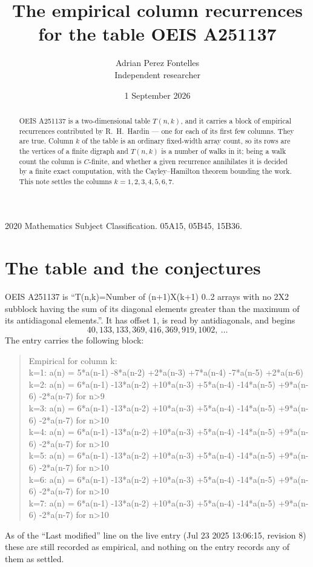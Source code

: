 \documentclass[11pt,a4paper]{article}
\title{The empirical column recurrences for the table OEIS A251137}
\author{Adrian Perez Fontelles\\ \small Independent researcher}
\date{1 September 2026}
\theoremstyle{plain}
\theoremstyle{definition}
\begin{document}
\maketitle

\begin{abstract}
OEIS A251137 is a two-dimensional table $T(n,k)$, and it carries a block of empirical
recurrences contributed by R.~H.~Hardin --- one for each of its first few columns. They are
true. Column $k$ of the table is an ordinary fixed-width array count, so its rows are the
vertices of a finite digraph and $T(n,k)$ is a number of walks in it; being a walk count the
column is $C$-finite, and whether a given recurrence annihilates it is decided by a finite
exact computation, with the Cayley--Hamilton theorem bounding the work. This note settles the
columns $k=1, 2, 3, 4, 5, 6, 7$.
\end{abstract}

\noindent\small 2020 Mathematics Subject Classification. 05A15, 05B45, 15B36.\normalsize

\section{The table and the conjectures}

OEIS A251137 is ``T(n,k)=Number of (n+1)X(k+1) 0..2 arrays with no 2X2 subblock having the sum of its diagonal elements greater than the maximum of its antidiagonal elements.''. It has offset $1$, is
read by antidiagonals, and begins
\[
40, 133, 133, 369, 416, 369, 919, 1002,\ \dots
\]
The entry carries the following block:
\begin{quote}\small
Empirical for column k:\\
k=1: a(n) = 5*a(n-1) -8*a(n-2) +2*a(n-3) +7*a(n-4) -7*a(n-5) +2*a(n-6)\\
k=2: a(n) = 6*a(n-1) -13*a(n-2) +10*a(n-3) +5*a(n-4) -14*a(n-5) +9*a(n-6) -2*a(n-7) for n>9\\
k=3: a(n) = 6*a(n-1) -13*a(n-2) +10*a(n-3) +5*a(n-4) -14*a(n-5) +9*a(n-6) -2*a(n-7) for n>10\\
k=4: a(n) = 6*a(n-1) -13*a(n-2) +10*a(n-3) +5*a(n-4) -14*a(n-5) +9*a(n-6) -2*a(n-7) for n>10\\
k=5: a(n) = 6*a(n-1) -13*a(n-2) +10*a(n-3) +5*a(n-4) -14*a(n-5) +9*a(n-6) -2*a(n-7) for n>10\\
k=6: a(n) = 6*a(n-1) -13*a(n-2) +10*a(n-3) +5*a(n-4) -14*a(n-5) +9*a(n-6) -2*a(n-7) for n>10\\
k=7: a(n) = 6*a(n-1) -13*a(n-2) +10*a(n-3) +5*a(n-4) -14*a(n-5) +9*a(n-6) -2*a(n-7) for n>10\\
\end{quote}
As of the ``Last modified'' line on the live entry (Jul 23 2025 13:06:15, revision 8) these are still
recorded as empirical, and nothing on the entry records any of them as settled.
\end{document}
